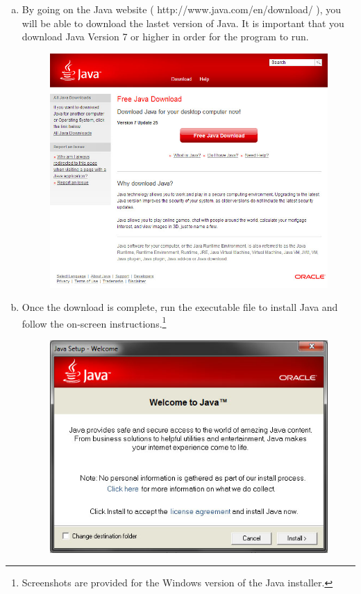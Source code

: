 \documentclass{article}
\begin{document}
\begin{enumerate}[(a)]
  \item By going on the Java website ( http://www.java.com/en/download/ ), you will be able to download the lastet version of Java. It is important that you download Java Version 7 or higher in order for the program to run.
	\begin{figure}[!htb]
	\centering
	\includegraphics[scale=0.55]{images/javaInstall1.jpg}
	\end{figure}
\pagebreak
  \item Once the download is complete, run the executable file to install Java and follow the on-screen instructions.\footnote{Screenshots are provided for the Windows version of the Java installer.}
	\begin{figure}[!htb]
	\centering
	\includegraphics[scale=0.6]{images/javaInstall2.jpg}

\end{figure}
\end{enumerate}
\end{document}
